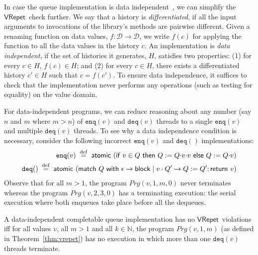 \documentclass{LMCS}
\newcommand{\defeq}{\;\stackrel{\rm def}{=}\;}
\newcommand{\enq}{\ensuremath{\mathtt{enq}}}
\newcommand{\deq}{\ensuremath{\mathtt{deq}}}
\newcommand{\Prg}{\mathit{Prg}}
\newcommand{\VRepet}{\ensuremath{\mathsf{VRepet}}}
\begin{document}
In case the queue implementation is data independent~\cite{WP1986}, we can
simplify the \VRepet\ check further.
We say that a history is \emph{differentiated}, if all the input arguments to invocations
of the library's methods are pairwise different.  Given a renaming function on data
values, $f : \mathcal{D} \to \mathcal{D}$, we write $f(c)$ for applying the function
to all the data values in the history $c$.
An implementation is \emph{data independent}, if the set of histories it generates, $H$,
satisfies two properties: (1) for every $c \in H$, $f(c) \in H$; and (2) for every $c \in H$,
there exists a differentiated history $c' \in H$ such that $c = f(c')$.
To ensure data independence, it suffices to check that the implementation
never performs any operations (such as testing for equality) on the value domain.

For data-independent programs, we can reduce reasoning about any number 
(say $n$ and $m$ where $m > n$) of $\enq(v)$ and
$\deq(v)$ threads to a single $\enq(v)$ and multiple $\deq(v)$ threads.
To see why a data independence condition is necessary,
consider the following incorrect $\enq(v)$ and $\deq()$ implementations:
\begin{align*}
\enq(v) \defeq \mathsf{atomic}\ (\mathsf{if}\ v \in Q\ \mathsf{then}\ Q := Q{\cdot}v{\cdot}v\ \mathsf{else}\ Q := Q{\cdot}v) \\
\deq() \defeq \mathsf{atomic}\ (\mathsf{match}\ Q\ \mathsf{with}\ \epsilon \to \mathsf{block} \mid v\cdot Q' \to Q:=Q'; \mathsf{return}\ v)
\end{align*}
Observe that for all $m > 1$, the program $\Prg(v,1,m,0)$ never terminates whereas
the program $\Prg(v,2,3,0)$ has a terminating execution: the serial execution where
both enqueues take place before all the dequeues.


\begin{thm}\label{thm:vrepet-di}
A data-independent completable queue implementation has no \VRepet\ violations
iff for all values $v$, all $m > 1$ and all $k \in \mathbb{N}$, the program
$\Prg(v,1,m)$ (as defined in Theorem~\ref{thm:vrepet})
has no execution in which more than one $\deq(v)$ threads terminate.
\end{thm}
\end{document}
